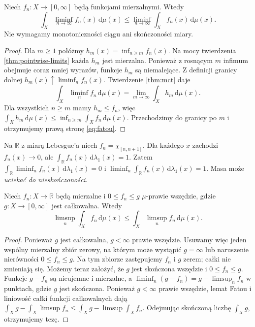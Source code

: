 \begin{twierdzenie}
\label{thm:fatou}
Niech $f_n:X\to[0,\infty]$ będą funkcjami mierzalnymi.
Wtedy
\begin{equation}\label{eq:fatou}
\int_X\liminf_{n\to\infty}f_n(x)\,\mathrm d\mu(x)
\le\liminf_{n\to\infty}\int_Xf_n(x)\,\mathrm d\mu(x).
\end{equation}
Nie wymagamy monotoniczności ciągu ani skończoności miary.
\end{twierdzenie}
\begin{proof}
Dla $m\ge1$ połóżmy
$h_m(x)=\inf_{n\ge m}f_n(x)$.
Na mocy twierdzenia \ref{thm:pointwise-limits}
każda $h_m$ jest mierzalna. Ponieważ z rosnącym $m$
infimum obejmuje coraz mniej wyrazów, funkcje $h_m$
są niemalejące. Z definicji granicy dolnej
$h_m(x)\uparrow\liminf_nf_n(x)$.
Twierdzenie \ref{thm:mct} daje
\[
\int_X\liminf_nf_n\,\mathrm d\mu(x)
=\lim_{m\to\infty}\int_Xh_m\,\mathrm d\mu(x).
\]
Dla wszystkich $n\ge m$ mamy $h_m\le f_n$, więc
$\int_Xh_m\,\mathrm d\mu(x)\le
\inf_{n\ge m}\int_Xf_n\,\mathrm d\mu(x)$.
Przechodzimy do granicy po $m$ i otrzymujemy
prawą stronę \eqref{eq:fatou}.
\end{proof}

\begin{przyklad}
Na $\mathbb R$ z miarą Lebesgue'a niech
$f_n=\chi_{[n,n+1]}$. Dla każdego $x$ zachodzi
$f_n(x)\to0$, ale $\int_{\mathbb R} f_n(x)\,\mathrm d\lambda_1(x)=1$.
Zatem $\int_{\mathbb R}\liminf_nf_n(x)\,\mathrm d\lambda_1(x)=0$
i $\liminf_n\int_{\mathbb R} f_n(x)\,\mathrm d\lambda_1(x)=1$.
Masa może \emph{uciekać do nieskończoności}.
\end{przyklad}

\begin{wniosek}
\label{cor:reverse-fatou}
Niech $f_n:X\to\mathbb R$ będą mierzalne i
$0\le f_n\le g$ $\mu$-prawie wszędzie, gdzie
$g:X\to[0,\infty]$ jest całkowalna. Wtedy
\[
\limsup_n\int_Xf_n\,\mathrm d\mu(x)
\le\int_X\limsup_nf_n\,\mathrm d\mu(x).
\]
\end{wniosek}
\begin{proof}
Ponieważ $g$ jest całkowalna, $g<\infty$ prawie
wszędzie. Usuwamy więc jeden wspólny mierzalny
zbiór zerowy, na którym może wystąpić $g=\infty$
lub naruszenie nierówności $0\le f_n\le g$.
Na tym zbiorze zastępujemy $f_n$ i $g$ zerem;
całki nie zmieniają się. Możemy teraz założyć,
że $g$ jest skończona wszędzie i $0\le f_n\le g$.
Funkcje $g-f_n$ są nieujemne i mierzalne, a
$\liminf_n(g-f_n)=g-\limsup_nf_n$ w punktach,
gdzie $g$ jest skończona. Ponieważ $g<\infty$
prawie wszędzie, lemat Fatou i liniowość całki
funkcji całkowalnych dają
$\int_X g-\int_X\limsup f_n\le
\int_X g-\limsup\int_X f_n$.
Odejmując skończoną liczbę $\int_X g$,
otrzymujemy tezę.
\end{proof}

